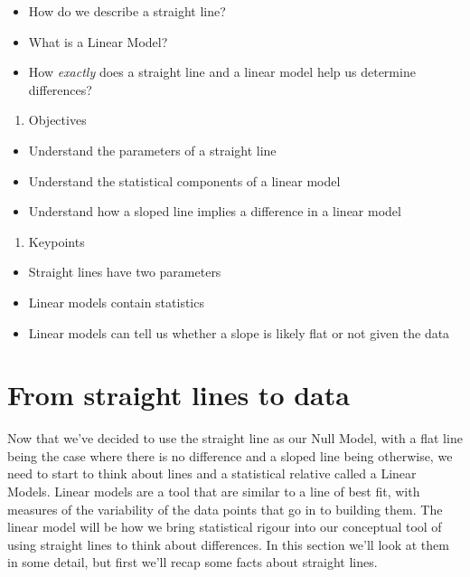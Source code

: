 \documentclass[
]{book}
\providecommand{\tightlist}{%
  \setlength{\itemsep}{0pt}\setlength{\parskip}{0pt}}
\begin{document}
\begin{itemize}
\tightlist
\item
  How do we describe a straight line?
\item
  What is a Linear Model?
\item
  How \emph{exactly} does a straight line and a linear model help us determine differences?
\end{itemize}

\begin{enumerate}
\def\labelenumi{\arabic{enumi}.}
\setcounter{enumi}{1}
\tightlist
\item
  Objectives
\end{enumerate}

\begin{itemize}
\tightlist
\item
  Understand the parameters of a straight line
\item
  Understand the statistical components of a linear model
\item
  Understand how a sloped line implies a difference in a linear model
\end{itemize}

\begin{enumerate}
\def\labelenumi{\arabic{enumi}.}
\setcounter{enumi}{2}
\tightlist
\item
  Keypoints
\end{enumerate}

\begin{itemize}
\tightlist
\item
  Straight lines have two parameters
\item
  Linear models contain statistics
\item
  Linear models can tell us whether a slope is likely flat or not given the data
\end{itemize}

\hypertarget{from-straight-lines-to-data}{%
\section{From straight lines to data}\label{from-straight-lines-to-data}}

Now that we've decided to use the straight line as our Null Model, with a flat line being the case where there is no difference and a sloped line being otherwise, we need to start to think about lines and a statistical relative called a Linear Models. Linear models are a tool that are similar to a line of best fit, with measures of the variability of the data points that go in to building them. The linear model will be how we bring statistical rigour into our conceptual tool of using straight lines to think about differences. In this section we'll look at them in some detail, but first we'll recap some facts about straight lines.
\end{document}
